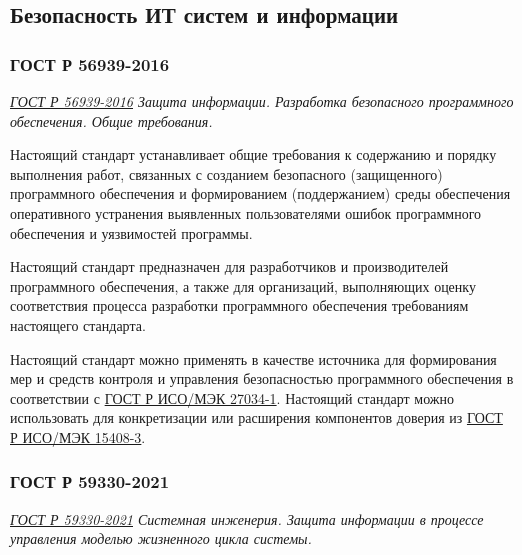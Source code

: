 
\subsection{Безопасность ИТ систем и информации}

\subsubsection{ГОСТ Р 56939-2016}

\emph{\href{https://docs.cntd.ru/document/1200135525}{ГОСТ Р 56939-2016}
Защита информации.
Разработка безопасного программного обеспечения.
Общие требования.
}

Настоящий стандарт устанавливает общие требования к содержанию
и порядку выполнения работ, связанных с созданием безопасного (защищенного)
программного обеспечения и формированием (поддержанием)
среды обеспечения оперативного устранения выявленных пользователями
ошибок программного обеспечения и уязвимостей программы.

Настоящий стандарт предназначен для разработчиков
и производителей программного обеспечения, а также для организаций,
выполняющих оценку соответствия процесса разработки
программного обеспечения требованиям настоящего стандарта.

Настоящий стандарт можно применять в качестве источника для формирования мер
и средств контроля и управления безопасностью программного обеспечения
в соответствии с
\href{https://docs.cntd.ru/document/1200112883}{ГОСТ Р ИСО/МЭК 27034-1}.
Настоящий стандарт можно использовать для конкретизации
или расширения компонентов доверия из
\href{https://docs.cntd.ru/document/1200105711}{ГОСТ Р ИСО/МЭК 15408-3}.

\subsubsection{ГОСТ Р 59330-2021}

\emph{\href{https://docs.cntd.ru/document/1200179342}{ГОСТ Р 59330-2021}
Системная инженерия.
Защита информации в процессе управления моделью жизненного цикла системы.
}

